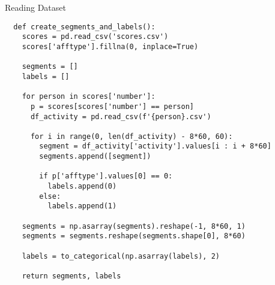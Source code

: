 \begin{code}
  \caption{Reading Dataset}
  \label{code:reading_dataset}
  
  \begin{verbatim}
  def create_segments_and_labels():
    scores = pd.read_csv('scores.csv')
    scores['afftype'].fillna(0, inplace=True)
    
    segments = []
    labels = []

    for person in scores['number']:
      p = scores[scores['number'] == person]
      df_activity = pd.read_csv(f'{person}.csv')

      for i in range(0, len(df_activity) - 8*60, 60):
        segment = df_activity['activity'].values[i : i + 8*60]
        segments.append([segment])

        if p['afftype'].values[0] == 0: 
          labels.append(0)
        else:
          labels.append(1)

    segments = np.asarray(segments).reshape(-1, 8*60, 1)
    segments = segments.reshape(segments.shape[0], 8*60)

    labels = to_categorical(np.asarray(labels), 2)
    
    return segments, labels
  \end{verbatim}
\end{code}